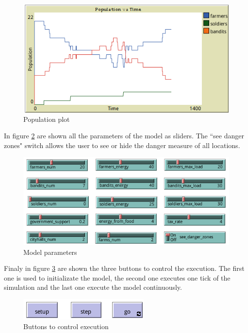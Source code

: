 \documentclass{wscpaperproc}
\begin{document}
\begin{figure}[h!]
    \centering
    \includegraphics[scale=0.5]{Images/Population1}
    \caption{Population plot}
    \label{imp:population_plot1}
\end{figure}

In figure \ref{imp:parameters1} are shown all the parameters of the model as
sliders. The ``see danger zones" switch allows the user to see or hide the
danger measure of all locations.\\

\begin{figure}[h!]
    \centering
    \includegraphics[scale=0.5]{Images/Sliders1}
    \caption{Model parameters}
    \label{imp:parameters1}
\end{figure}

Finaly in figure \ref{imp:buttons} are shown the three buttons to control the
execution. The first one is used to initializate the model, the second one
executes one tick of the simulation and the last one execute the model
continuously.

\begin{figure}[h!]
    \centering
    \includegraphics[scale=0.5]{Images/Buttons}
    \caption{Buttons to control execution}
    \label{imp:buttons}
\end{figure}
\end{document}
